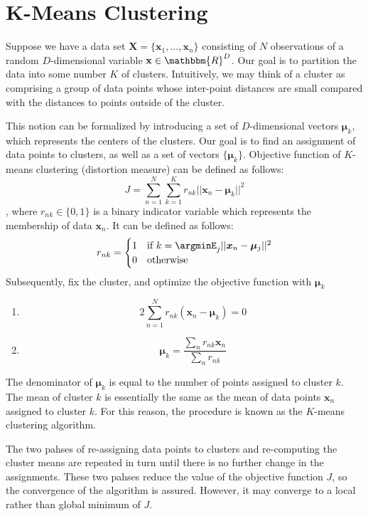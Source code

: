 

\section{K-Means Clustering}
Suppose we have a data set $\mathbf{X} = \{\mathbf{x}_1,...,\mathbf{x}_n\}$ consisting of $N$ observations of a random $D$-dimensional variable $\mathbf{x}\in \mathbbm{R}^{D}$. Our goal is to partition the data into some number $K$ of clusters.  Intuitively, we may think of a cluster as comprising a group of data points whose inter-point distances are small compared with the distances to points outside of the cluster.

This notion can be formalized by introducing a set of $D$-dimensional vectors $\boldsymbol{\mu}_k$, which represents the centers of the clusters. Our goal is to find an assignment of data points to clusters, as well as a set of vectors $\{\boldsymbol{\mu}_k\}$. Objective function of $K$-means clustering (distortion measure) can be defined as follows:
$$J =  \sum_{n=1}^{N}\sum_{k=1}^{K}r_{nk}||\boldsymbol{x}_n-\boldsymbol{\mu}_k||^2$$
, where $r_{nk}\in\{0,1\}$ is a binary indicator variable which represents the membership of data $\mathbf{x}_n$. It can be defined as follows:
$$r_{nk}=\begin{cases}
1 & \textrm{if } k=\argminE_{j} ||\boldsymbol{x}_n-\boldsymbol{\mu}_j||^2\\
0 & \textrm{otherwise}
\end{cases}$$
Subsequently, fix the cluster, and optimize the objective function with  $\boldsymbol{\mu}_k$
\begin{enumerate}
	\item $$2\sum_{n=1}^{N}r_{nk}(\boldsymbol{x}_n-\boldsymbol{\mu}_k) = 0$$
	\item $$\boldsymbol{\mu}_k = \frac{\sum_n r_{nk}\boldsymbol{x}_n}{\sum_n r_{nk}}$$
\end{enumerate}
The denominator of $\boldsymbol{\mu}_k$ is equal to the number of points assigned to cluster $k$. The mean of cluster $k$ is essentially the same as the mean of data points $\mathbf{x}_n$ assigned to cluster $k$. For this reason, the procedure is known as the $K$-means clustering algorithm. 

The two pahses of re-assigning data points to clusters and re-computing the cluster means are repeated in turn until there is no further change in the assignments. These two pahses reduce the value of the objective function $J$, so the convergence of the algorithm is assured. However, it may converge to a local rather than global minimum of $J$. 
